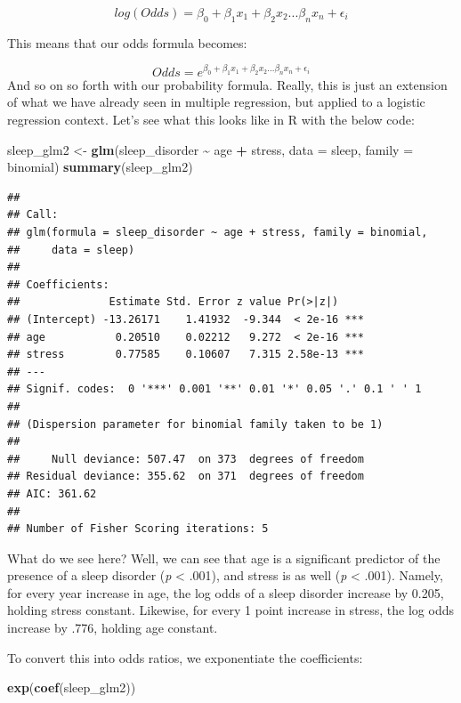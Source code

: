 \documentclass[
]{book}
\newenvironment{Shaded}{\begin{snugshade}}{\end{snugshade}}
\newcommand{\AttributeTok}[1]{\textcolor[rgb]{0.13,0.29,0.53}{#1}}
\newcommand{\FunctionTok}[1]{\textcolor[rgb]{0.13,0.29,0.53}{\textbf{#1}}}
\newcommand{\NormalTok}[1]{#1}
\newcommand{\OtherTok}[1]{\textcolor[rgb]{0.56,0.35,0.01}{#1}}
\newcommand{\SpecialCharTok}[1]{\textcolor[rgb]{0.81,0.36,0.00}{\textbf{#1}}}
\begin{document}
\[
log(Odds) = \beta_0 + \beta_1 x_1 + \beta_2 x_2 ... \beta_n x_n + \epsilon_i
\]

This means that our odds formula becomes:

\[
Odds = e^{\beta_0 + \beta_1 x_1 + \beta_2 x_2 ... \beta_n x_n + \epsilon_i}
\]
And so on so forth with our probability formula. Really, this is just an extension of what we have already seen in multiple regression, but applied to a logistic regression context. Let's see what this looks like in R with the below code:

\begin{Shaded}
\begin{Highlighting}[]
\NormalTok{sleep\_glm2 }\OtherTok{\textless{}{-}} \FunctionTok{glm}\NormalTok{(sleep\_disorder }\SpecialCharTok{\textasciitilde{}}\NormalTok{ age }\SpecialCharTok{+}\NormalTok{ stress, }\AttributeTok{data =}\NormalTok{ sleep, }\AttributeTok{family =}\NormalTok{ binomial)}
\FunctionTok{summary}\NormalTok{(sleep\_glm2)}
\end{Highlighting}
\end{Shaded}

\begin{verbatim}
## 
## Call:
## glm(formula = sleep_disorder ~ age + stress, family = binomial, 
##     data = sleep)
## 
## Coefficients:
##              Estimate Std. Error z value Pr(>|z|)    
## (Intercept) -13.26171    1.41932  -9.344  < 2e-16 ***
## age           0.20510    0.02212   9.272  < 2e-16 ***
## stress        0.77585    0.10607   7.315 2.58e-13 ***
## ---
## Signif. codes:  0 '***' 0.001 '**' 0.01 '*' 0.05 '.' 0.1 ' ' 1
## 
## (Dispersion parameter for binomial family taken to be 1)
## 
##     Null deviance: 507.47  on 373  degrees of freedom
## Residual deviance: 355.62  on 371  degrees of freedom
## AIC: 361.62
## 
## Number of Fisher Scoring iterations: 5
\end{verbatim}

What do we see here? Well, we can see that age is a significant predictor of the presence of a sleep disorder (\emph{p} \textless{} .001), and stress is as well (\emph{p} \textless{} .001). Namely, for every year increase in age, the log odds of a sleep disorder increase by 0.205, holding stress constant. Likewise, for every 1 point increase in stress, the log odds increase by .776, holding age constant.

To convert this into odds ratios, we exponentiate the coefficients:

\begin{Shaded}
\begin{Highlighting}[]
\FunctionTok{exp}\NormalTok{(}\FunctionTok{coef}\NormalTok{(sleep\_glm2))}
\end{Highlighting}
\end{Shaded}
\end{document}
